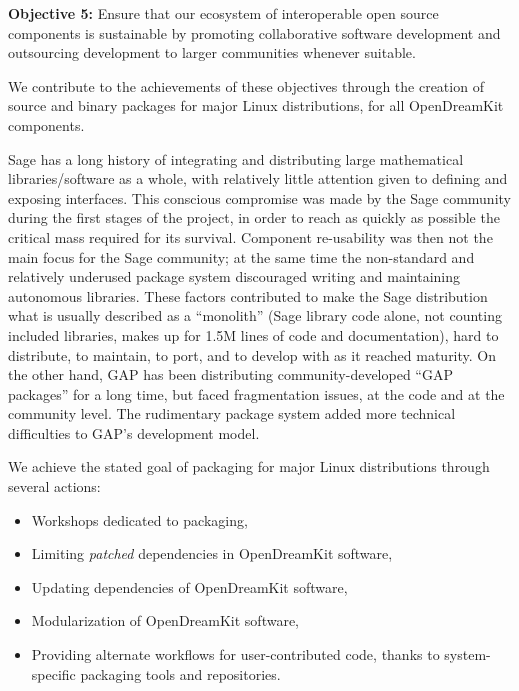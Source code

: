 \textbf{Objective 5:} Ensure that our ecosystem of interoperable open
source components is sustainable by promoting collaborative software
development and outsourcing development to larger communities whenever
suitable.

We contribute to the achievements of these objectives through the
creation of source and binary packages for major Linux distributions,
for all OpenDreamKit components.

Sage has a long history of integrating and distributing large
mathematical libraries/software as a whole, with relatively little
attention given to defining and exposing interfaces. This conscious
compromise was made by the Sage community during the first stages of the
project, in order to reach as quickly as possible the critical mass
required for its survival. Component re-usability was then not the main
focus for the Sage community; at the same time the non-standard and
relatively underused package system discouraged writing and maintaining
autonomous libraries. These factors contributed to make the Sage
distribution what is usually described as a ``monolith'' (Sage library
code alone, not counting included libraries, makes up for 1.5M lines of
code and documentation), hard to distribute, to maintain, to port, and
to develop with as it reached maturity. On the other hand, GAP has been
distributing community-developed ``GAP packages'' for a long time, but
faced fragmentation issues, at the code and at the community level. The
rudimentary package system added more technical difficulties to GAP's
development model.

We achieve the stated goal of packaging for major Linux distributions
through several actions:

\begin{itemize}
\tightlist
\item
  Workshops dedicated to packaging,
\item
  Limiting \emph{patched} dependencies in OpenDreamKit software,
\item
  Updating dependencies of OpenDreamKit software,
\item
  Modularization of OpenDreamKit software,
\item
  Providing alternate workflows for user-contributed code, thanks to
  system-specific packaging tools and repositories.
\end{itemize}
